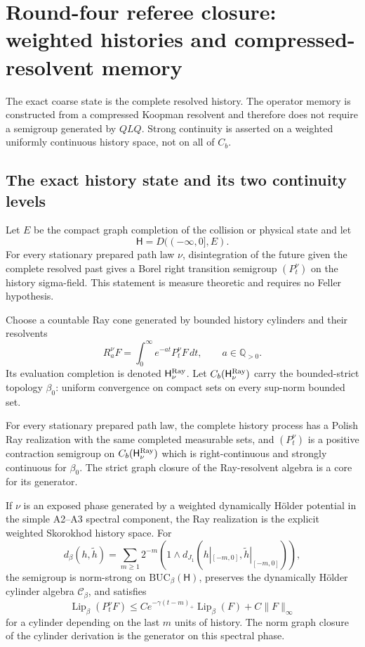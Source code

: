 \section{Round-four referee closure: weighted histories and compressed-resolvent memory}
\label{sec:r3-a4}

The exact coarse state is the complete resolved history.  The operator memory
is constructed from a compressed Koopman resolvent and therefore does not
require a semigroup generated by \(QLQ\).  Strong continuity is asserted on a
weighted uniformly continuous history space, not on all of \(C_b\).

\subsection{The exact history state and its two continuity levels}

Let \(E\) be the compact graph completion of the collision or physical state
and let
\[
 \mathsf H=D(( -\infty,0],E).
\]
For every stationary prepared path law \(\nu\), disintegration of the future
given the complete resolved past gives a Borel right transition semigroup
\((P_t^\nu)\) on the history sigma-field.  This statement is measure
theoretic and requires no Feller hypothesis.

Choose a countable Ray cone generated by bounded history cylinders and their
resolvents
\[
 R_a^\nu F=\int_0^\infty e^{-at}P_t^\nu F\,dt,
 \qquad a\in\mathbb Q_{>0}.
\]
Its evaluation completion is denoted \(\mathsf H_\nu^{\rm Ray}\).  Let
\(C_b(\mathsf H_\nu^{\rm Ray})\) carry the bounded-strict topology
\(\beta_0\): uniform convergence on compact sets on every sup-norm bounded
set.

\begin{theorem}
\label{thm:r3-a4-feller}
For every stationary prepared path law, the complete history process has a
Polish Ray realization with the same completed measurable sets, and
\((P_t^\nu)\) is a positive contraction semigroup on
\(C_b(\mathsf H_\nu^{\rm Ray})\) which is right-continuous and strongly
continuous for \(\beta_0\).  The strict graph closure of the Ray-resolvent
algebra is a core for its generator.

If \(\nu\) is an exposed phase generated by a weighted dynamically H\"older
potential in the simple A2--A3 spectral component, the Ray realization is the
explicit weighted Skorokhod history space.  For
\[
 d_\beta(h,\widetilde h)=
 \sum_{m\ge1}2^{-m}
 \left(1\wedge d_{J_1}
 (h|_{[-m,0]},\widetilde h|_{[-m,0]})\right),
\]
the semigroup is norm-strong on
\(\mathrm{BUC}_\beta(\mathsf H)\), preserves the dynamically H\"older
cylinder algebra \(\mathscr C_\beta\), and satisfies
\[
 \operatorname{Lip}_\beta(P_t^\nu F)
 \le C e^{-\gamma(t-m)_+}\operatorname{Lip}_\beta(F)
     +C\|F\|_\infty
\]
for a cylinder depending on the last \(m\) units of history.  The norm graph
closure of the cylinder derivation is the generator on this spectral phase.
\end{theorem}

